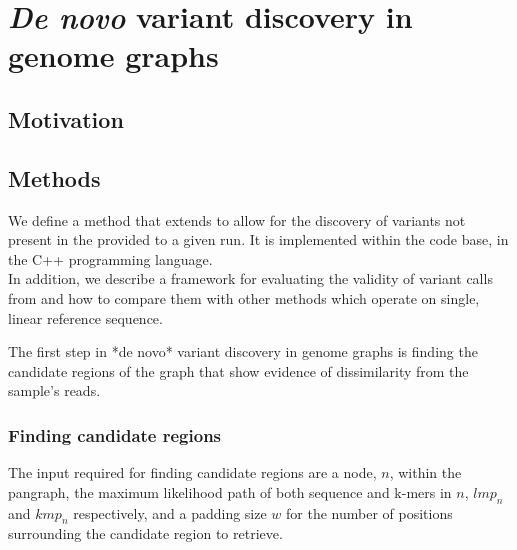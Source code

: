 
\chapter{\textit{De novo} variant discovery in genome graphs}

\ifpdf
    \graphicspath{{Chapter1/Figs/Raster/}{Chapter1/Figs/PDF/}{Chapter1/Figs/}}
\else
    \graphicspath{{Chapter1/Figs/Vector/}{Chapter1/Figs/}}
\fi


\section{Motivation}

\section{Methods}

We define a method that extends \pandora{} to allow for the discovery of variants not present in the \prg{} provided to a given run. It is implemented within the \pandora{} code base, in the C++ programming language. \\
In addition, we describe a framework for evaluating the validity of variant calls from \pandora{} and how to compare them with other methods which operate on single, linear reference sequence.

The first step in *de novo* variant discovery in genome graphs is finding the candidate regions of the graph that show evidence of dissimilarity from the sample's reads.


\subsection{Finding candidate regions}

The input required for finding candidate regions are a node, $n$, within the \pandora{} pangraph, the maximum likelihood path of both sequence and k-mers in $n$, $lmp_n$ and $kmp_n$ respectively, and a padding size $w$ for the number of positions surrounding the candidate region to retrieve. \\


